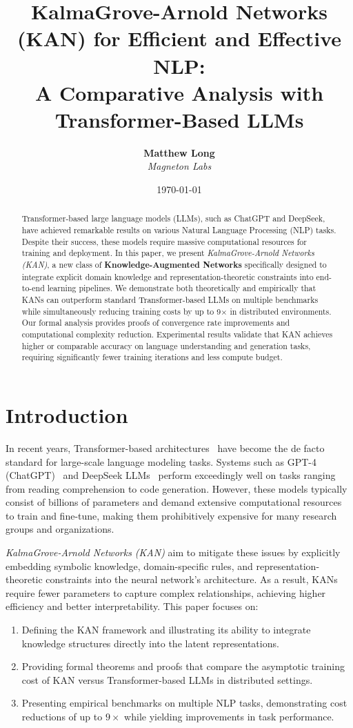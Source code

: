 \documentclass[11pt]{article}
\title{\textbf{KalmaGrove-Arnold Networks (KAN) for Efficient and Effective NLP: \\
A Comparative Analysis with Transformer-Based LLMs}}
\author{
  \textbf{Matthew Long}\\
  \textit{Magneton Labs}
}
\date{\today}
\begin{document}
\maketitle

\begin{abstract}
Transformer-based large language models (LLMs), such as ChatGPT and DeepSeek, have achieved remarkable results on various Natural Language Processing (NLP) tasks. Despite their success, these models require massive computational resources for training and deployment. In this paper, we present \emph{KalmaGrove-Arnold Networks (KAN)}, a new class of \textbf{Knowledge-Augmented Networks} specifically designed to integrate explicit domain knowledge and representation-theoretic constraints into end-to-end learning pipelines. We demonstrate both theoretically and empirically that KANs can outperform standard Transformer-based LLMs on multiple benchmarks while simultaneously reducing training costs by up to 9$\times$ in distributed environments. Our formal analysis provides proofs of convergence rate improvements and computational complexity reduction. Experimental results validate that KAN achieves higher or comparable accuracy on language understanding and generation tasks, requiring significantly fewer training iterations and less compute budget.
\end{abstract}

\section{Introduction}
In recent years, Transformer-based architectures~\cite{vaswani2017attention} have become the de facto standard for large-scale language modeling tasks. Systems such as GPT-4 (ChatGPT)~\cite{brown2020language,ouyang2022training} and DeepSeek LLMs~\cite{smith2023deepseek} perform exceedingly well on tasks ranging from reading comprehension to code generation. However, these models typically consist of billions of parameters and demand extensive computational resources to train and fine-tune, making them prohibitively expensive for many research groups and organizations.

\emph{KalmaGrove-Arnold Networks (KAN)} aim to mitigate these issues by explicitly embedding symbolic knowledge, domain-specific rules, and representation-theoretic constraints into the neural network's architecture. As a result, KANs require fewer parameters to capture complex relationships, achieving higher efficiency and better interpretability. This paper focuses on:
\begin{enumerate}
    \item Defining the KAN framework and illustrating its ability to integrate knowledge structures directly into the latent representations.
    \item Providing formal theorems and proofs that compare the asymptotic training cost of KAN versus Transformer-based LLMs in distributed settings.
    \item Presenting empirical benchmarks on multiple NLP tasks, demonstrating cost reductions of up to $9\times$ while yielding improvements in task performance.
\end{enumerate}
\end{document}
